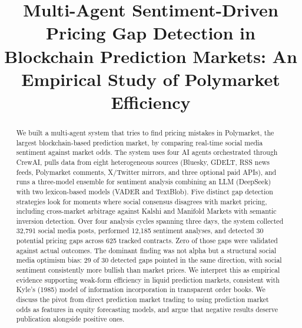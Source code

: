 \documentclass[conference]{IEEEtran}
\begin{document}
\title{Multi-Agent Sentiment-Driven Pricing Gap Detection in Blockchain Prediction Markets: An Empirical Study of Polymarket Efficiency}

\author{
\and
{}
}

\maketitle

\begin{abstract}
We built a multi-agent system that tries to find pricing mistakes in Polymarket, the largest blockchain-based prediction market, by comparing real-time social media sentiment against market odds. The system uses four AI agents orchestrated through CrewAI, pulls data from eight heterogeneous sources (Bluesky, GDELT, RSS news feeds, Polymarket comments, X/Twitter mirrors, and three optional paid APIs), and runs a three-model ensemble for sentiment analysis combining an LLM (DeepSeek) with two lexicon-based models (VADER and TextBlob). Five distinct gap detection strategies look for moments where social consensus disagrees with market pricing, including cross-market arbitrage against Kalshi and Manifold Markets with semantic inversion detection. Over four analysis cycles spanning three days, the system collected 32,791 social media posts, performed 12,185 sentiment analyses, and detected 30 potential pricing gaps across 625 tracked contracts. Zero of those gaps were validated against actual outcomes. The dominant finding was not alpha but a structural social media optimism bias: 29 of 30 detected gaps pointed in the same direction, with social sentiment consistently more bullish than market prices. We interpret this as empirical evidence supporting weak-form efficiency in liquid prediction markets, consistent with Kyle's (1985) model of information incorporation in transparent order books. We discuss the pivot from direct prediction market trading to using prediction market odds as features in equity forecasting models, and argue that negative results deserve publication alongside positive ones.
\end{abstract}
\end{document}
